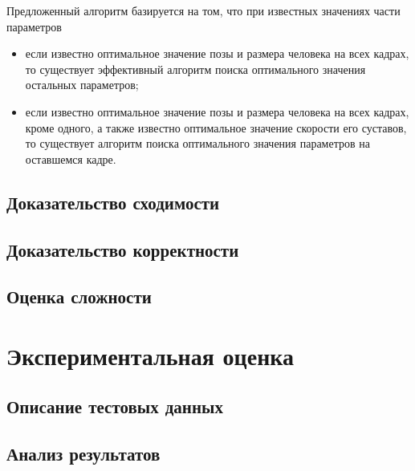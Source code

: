 Предложенный алгоритм базируется на том, что при известных значениях части параметров
\begin{itemize}
	\item если известно оптимальное значение позы и размера человека на всех кадрах, то существует эффективный алгоритм поиска оптимального значения остальных параметров;
	\item если известно оптимальное значение позы и размера человека на всех кадрах, кроме одного, а также известно оптимальное значение скорости его суставов, то существует алгоритм поиска оптимального значения параметров на оставшемся кадре.
\end{itemize}

\subsection{Доказательство сходимости}
\subsection{Доказательство корректности}
\subsection{Оценка сложности}
\section{Экспериментальная оценка}
\subsection{Описание тестовых данных}
\subsection{Анализ результатов}
